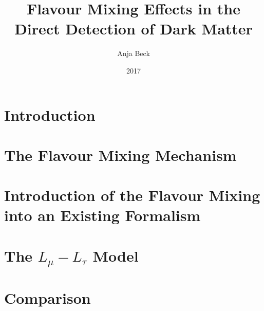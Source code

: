 \documentclass[
  tucolor,
  BCOR=12mm,     %
  parskip=half,  %
  open=any,      %
  cleardoublepage=plain,  %
]{tudothesis}
\author{Anja Beck}
\title{Flavour Mixing Effects in the Direct Detection of Dark Matter}
\date{2017}
\begin{document}
\frontmatter
%
\maketitle

\makecorrectorpage


\cleardoublepage
\tableofcontents

\mainmatter
\chapter{Introduction}

\chapter{The Flavour Mixing Mechanism}

\chapter{Introduction of the Flavour Mixing into an Existing Formalism}

\chapter{The \texorpdfstring{$L_\mu-L_\tau$}{TEXT} Model\label{sec:NewInt}}

\chapter{Comparison}

%

\appendix

\todos
\backmatter
\printbibliography

\cleardoublepage

\end{document}
